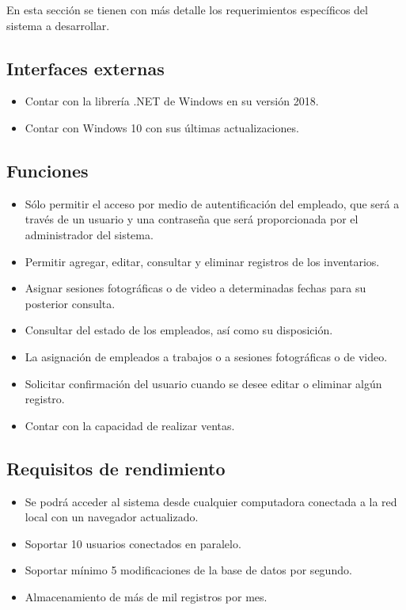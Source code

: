 En esta sección se tienen con más detalle los requerimientos específicos del sistema a desarrollar.

\subsection{Interfaces externas}
\begin{itemize}
\item Contar con la librería .NET de Windows en su versión 2018.
\item Contar con Windows 10 con sus últimas actualizaciones.
\end{itemize}

\subsection{Funciones}
\begin{itemize}
\item Sólo permitir el acceso por medio de autentificación del empleado, que será a través de un usuario y una contraseña que será proporcionada por el administrador del sistema.
\item Permitir agregar, editar, consultar y eliminar registros de los inventarios.
\item Asignar sesiones fotográficas o de video a determinadas fechas para su posterior consulta.
\item Consultar del estado de los empleados, así como su disposición.
\item La asignación de empleados a trabajos o a sesiones fotográficas o de video.
\item Solicitar confirmación del usuario cuando se desee editar o eliminar algún registro.
\item Contar con la capacidad de realizar ventas.
\end{itemize}

\subsection{Requisitos de rendimiento}
\begin{itemize}
\item Se podrá acceder al sistema desde cualquier computadora conectada a la red local
  con un navegador actualizado.
\item Soportar 10 usuarios conectados en paralelo.
\item Soportar mínimo 5 modificaciones de la base de datos por segundo.
\item Almacenamiento de más de mil registros por mes.
\end{itemize}

